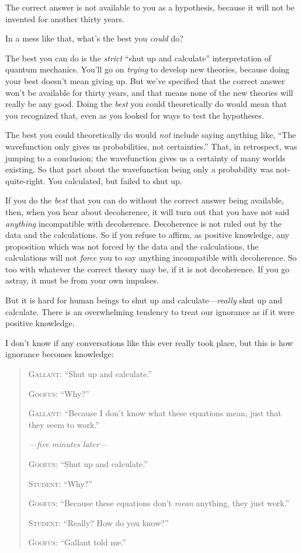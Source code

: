 {
 The correct answer is not available to you as a hypothesis,
because it will not be invented for another thirty years.}

{
 In a mess like that, what's the best you
\textit{could} do?}

{
 The best you can do is the \textit{strict} ``shut
up and calculate'' interpretation of quantum
mechanics. You'll go on \textit{trying} to develop new
theories, because doing your best doesn't mean giving
up. But we've specified that the correct answer
won't be available for thirty years, and that means
none of the new theories will really be any good. Doing the
\textit{best} you could theoretically do would mean that you recognized
that, even as you looked for ways to test the hypotheses.}

{
 The best you could theoretically do would \textit{not} include
saying anything like, ``The wavefunction only gives us
probabilities, not certainties.'' That, in
retrospect, was jumping to a conclusion; the wavefunction gives us a
certainty of many worlds existing. So that part about the wavefunction
being only a probability was not-quite-right. You calculated, but
failed to shut up.}

{
 If you do the \textit{best} that you can do without the correct
answer being available, then, when you hear about decoherence, it will
turn out that you have not said \textit{anything} incompatible with
decoherence. Decoherence is not ruled out by the data and the
calculations. So if you refuse to affirm, as positive knowledge, any
proposition which was not forced by the data and the calculations, the
calculations will not \textit{force} you to say anything incompatible
with decoherence. So too with whatever the correct theory may be, if it
is not decoherence. If you go astray, it must be from your own
impulses.}

{
 But it is hard for human beings to shut up and
calculate---\textit{really} shut up and calculate. There is an
overwhelming tendency to treat our ignorance as if it were positive
knowledge.}

{
 I don't know if any conversations like this ever
really took place, but this is how ignorance becomes knowledge:}

\begin{quotation}
{
 \textsc{Gallant}: ``Shut up and
calculate.''}

{
 \textsc{Goofus}: ``Why?''}

{
 \textsc{Gallant}: ``Because I don't know
what these equations mean, just that they seem to
work.''}

{
 \textit{{}---five minutes later---}}

{
 \textsc{Goofus}: ``Shut up and
calculate.''}

{
 \textsc{Student}: ``Why?''}

{
 \textsc{Goofus}: ``Because these equations
don't \textit{mean} anything, they just
work.''}

{
 \textsc{Student}: ``Really? How do you
know?''}

{
  \textsc{Goofus}: ``Gallant told me.''}
\end{quotation}

